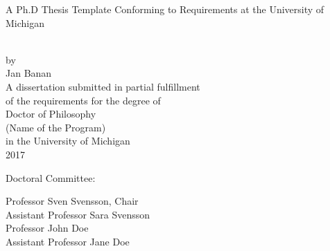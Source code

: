 \begin{titlepage}
 \begin{singlespace} %
  \hbox{\vspace{1.2in}} %
  \begin{center} %
   \begin{onehalfspacing}
    { A Ph.D Thesis Template Conforming to Requirements at the University of Michigan} %
   \end{onehalfspacing} \\[4ex] %
   by \\[2ex] %
   Jan Banan \\ %
   \vfill %
   A dissertation submitted in partial fulfillment \\ %
   of the requirements for the degree of \\ %
   Doctor of Philosophy \\ %
   (Name of the Program) \\ %
   in the University of Michigan \\ %
   2017 %
  \end{center} %
  \vfill %
  \begin{flushleft}
   \hspace{0.7in}Doctoral Committee: \\[2ex] %
   \hspace{1in} %
   \parbox{4.2in}{Professor Sven Svensson, Chair\\
                  Assistant Professor Sara Svensson\\
                  Professor John Doe\\
                  Assistant Professor Jane Doe}
  \end{flushleft} %
 \end{singlespace} %
\end{titlepage}

\clearpage
\thispagestyle{empty}

\hspace{0pt}

